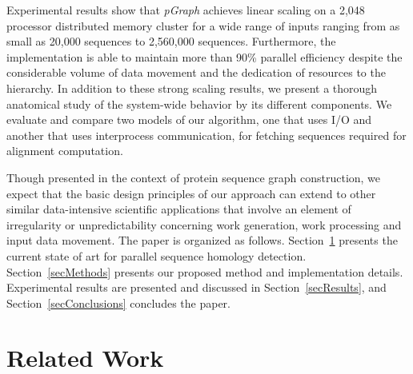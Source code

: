 \documentclass[10pt,journal,letterpaper,compsoc]{IEEEtran}
\begin{document}
Experimental results show that {\it pGraph} achieves linear scaling on a 2,048 processor distributed memory cluster for a wide range of inputs ranging from as small as 20,000 sequences to 2,560,000 sequences. Furthermore, the implementation is able to maintain more than 90\% parallel efficiency despite the considerable volume of data movement and the dedication of resources to the hierarchy. In addition to these strong scaling results, we present a thorough anatomical study of the system-wide behavior by its different components. We evaluate and compare two models of our algorithm, one that uses I/O and another that uses interprocess communication, for fetching sequences required for alignment computation. 

Though presented in the context of protein sequence graph construction, we expect that the basic design principles of our approach can extend to other similar data-intensive scientific applications that involve an element of irregularity or unpredictability concerning work generation, work processing and input data movement.
The paper is organized as follows. Section~\ref{secRelatedWork} presents the current state of art for parallel sequence homology detection. Section~\ref{secMethods} presents our proposed method and implementation details. Experimental results are presented and discussed in Section~\ref{secResults}, and Section~\ref{secConclusions} concludes the paper.



\section{Related Work}
\label{secRelatedWork}
\end{document}
